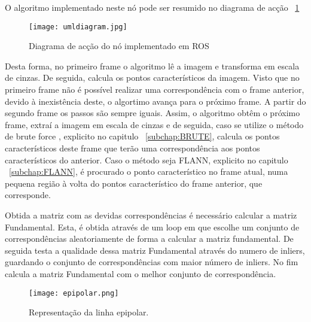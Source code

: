 	O algoritmo implementado neste nó pode ser resumido no diagrama de acção ~\ref{fig:diaguml}

	\begin{figure}[h!] %
		\begin{center}
			\leavevmode		
			\texttt{[image: umldiagram.jpg]}
			\caption{Diagrama de acção do nó implementado em ROS}
			\label{fig:diaguml}
		\end{center}
	\end{figure}


	
	Desta forma, no primeiro frame o algoritmo lê a imagem e transforma em escala de cinzas. De seguida, calcula os pontos característicos da imagem. Visto que no primeiro frame não é possível realizar uma correspondência com o frame anterior, devido à inexistência deste, o algortimo avança para o próximo frame. A partir do segundo frame os passos são sempre iguais. Assim, o algoritmo obtêm o próximo frame, extraí a imagem em escala de cinzas e de seguida, caso se utilize o método de brute force , explicito no capitulo ~\ref{subchap:BRUTE}, calcula os pontos característicos deste frame que terão uma correspondência aos pontos característicos do anterior. Caso o método seja FLANN, explicito no capitulo ~\ref{subchap:FLANN}, é procurado o ponto característico no frame atual, numa pequena região à volta do pontos característico do frame anterior, que corresponde.
	
	Obtida a matriz com as devidas correspondências é necessário calcular a matriz Fundamental. Esta, é obtida através de um loop em que escolhe um conjunto de correspondências aleatoriamente de forma a calcular a matriz fundamental. De seguida testa a qualidade dessa matriz Fundamental através do numero de inliers, guardando o conjunto de correspondências com maior número de inliers. No fim calcula a matriz Fundamental com o melhor conjunto de correspondência.
	
	
	\begin{figure}[h!] %
		\begin{center}
			\leavevmode		
			\texttt{[image: epipolar.png]}
			\caption{Representação da linha epipolar.}
			\label{fig:equ}
		\end{center}
	\end{figure}

